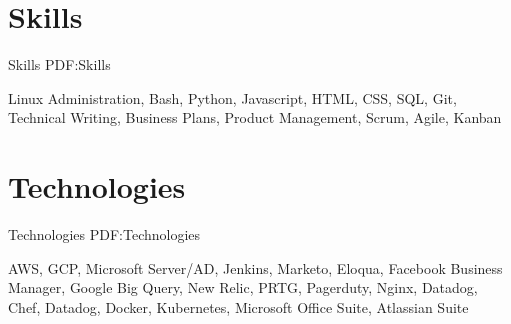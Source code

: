 \documentclass[a4paper,10pt,oneside]{article}
\begin{document}
\begin{body}







\section
{Skills}
{Skills}
{PDF:Skills}

Linux Administration, Bash, Python, Javascript,
HTML, CSS, SQL, Git, Technical Writing, Business Plans, Product Management, Scrum, Agile, Kanban




\section
{Technologies}
{Technologies}
{PDF:Technologies}

AWS,
GCP, Microsoft Server/AD, Jenkins, Marketo, Eloqua, Facebook Business Manager,
Google Big Query, New Relic, PRTG, Pagerduty, Nginx, Datadog, Chef, Datadog, Docker, Kubernetes, Microsoft Office Suite, Atlassian Suite

\end{body}

\end{document}
